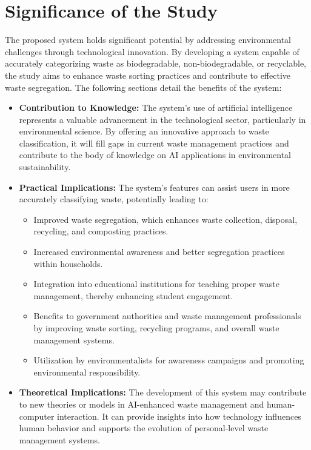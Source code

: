 \section{Significance of the Study}

The proposed system holds significant potential by addressing environmental challenges through technological innovation. By developing a system capable of accurately categorizing waste as biodegradable, non-biodegradable, or recyclable, the study aims to enhance waste sorting practices and contribute to effective waste segregation. The following sections detail the benefits of the system:

\begin{itemize}
	\item \textbf{Contribution to Knowledge:} The system’s use of artificial intelligence represents a valuable advancement in the technological sector, particularly in environmental science. By offering an innovative approach to waste classification, it will fill gaps in current waste management practices and contribute to the body of knowledge on AI applications in environmental sustainability.
	
	\item \textbf{Practical Implications:} The system’s features can assist users in more accurately classifying waste, potentially leading to:
	\begin{itemize}
		\item Improved waste segregation, which enhances waste collection, disposal, recycling, and composting practices.
		\item Increased environmental awareness and better segregation practices within households.
		\item Integration into educational institutions for teaching proper waste management, thereby enhancing student engagement.
		\item Benefits to government authorities and waste management professionals by improving waste sorting, recycling programs, and overall waste management systems.
		\item Utilization by environmentalists for awareness campaigns and promoting environmental responsibility.
	\end{itemize}
	
	\item \textbf{Theoretical Implications:} The development of this system may contribute to new theories or models in AI-enhanced waste management and human-computer interaction. It can provide insights into how technology influences human behavior and supports the evolution of personal-level waste management systems.
	

\end{itemize}

